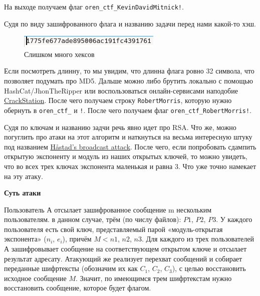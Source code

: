 \documentclass[idxtotoc,hyperref,openany,oneside]{files/crypto} %
\begin{document}
На выходе получаем флаг \verb|oren_ctf_KevinDavidMitnick!|.



Судя по виду зашифрованного флага и названию задачи перед нами какой-то хэш.
\begin{figure}[H]
\begin{center}
\includegraphics[width=1.0\linewidth]{files/md5flag}
\end{center}
\caption{Слишком много хексов}
\label{fig:chinese}
\end{figure}
Если посмотреть длинну, то мы увидим, что длинна флага ровно 32 символа, что позволяет подумать про MD5. Дальше можно либо брутить локально с помощью HashCat/JhonTheRipper или воспользоваться онлайн-сервисами наподобие \href{https://crackstation.net/}{CrackStation}. После чего получаем строку \verb|RobertMorris|, которую нужно обернуть в \verb|oren_ctf_| и \verb|!|. После чего получаем флаг \verb|oren_ctf_RobertMorris!|.




Судя по ключам и названию задчи речь явно идет про RSA. Что же, можно погуглить про атаки на этот алгоритм и наткнуться на весьма интересную штуку под названием \href{https://en.wikipedia.org/wiki/Coppersmith\%27s_attack#H\%C3\%A5stad's_broadcast_attack}{Håstad's broadcast attack}. После чего, если попробовать сдампить открытую экспоненту и модуль из наших открытых ключей, то можно увидеть, что во всех трех ключах экспонента маленькая и равна 3. Что уже точно намекает на эту атаку. 

\textbf{Суть атаки}

Пользователь $А$ отсылает зашифрованное сообщение m нескольким пользователям. в данном случае, трём (по числу файлов): $P1$, $P2$, $P3$. У каждого пользователя есть свой ключ, представляемый парой «модуль-открытая экспонента» ($n_i$, $e_i$), причём $M < n1$, $n2$, $n3$. Для каждого из трех пользователей $А$ зашифровывает сообщение на соответствующем открытом ключе и отсылает результат адресату.
Атакующий же реализует перехват сообщений и собирает переданные шифртексты (обозначим их как $C_1$, $C_2$, $C_3$), с целью восстановить исходное сообщение $M$. Значит, по имеющимся трем шифртекстам нужно восстановить сообщение, которое будет флагом.
\end{document}
